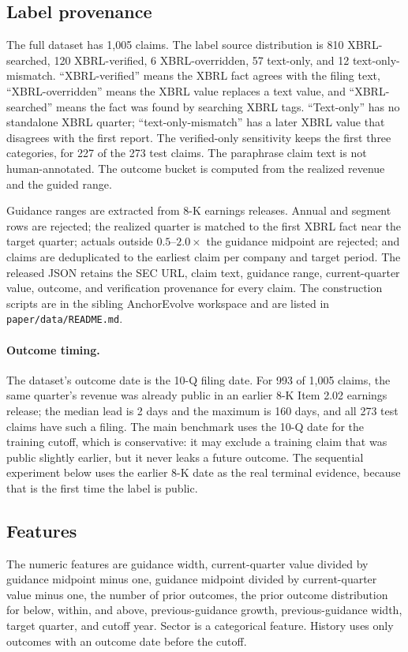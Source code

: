 \documentclass[11pt]{article}
\begin{document}
\subsection{Label provenance}
The full dataset has 1,005 claims. The label source distribution is 810 XBRL-searched, 120 XBRL-verified, 6 XBRL-overridden, 57 text-only, and 12 text-only-mismatch. ``XBRL-verified'' means the XBRL fact agrees with the filing text, ``XBRL-overridden'' means the XBRL value replaces a text value, and ``XBRL-searched'' means the fact was found by searching XBRL tags. ``Text-only'' has no standalone XBRL quarter; ``text-only-mismatch'' has a later XBRL value that disagrees with the first report. The verified-only sensitivity keeps the first three categories, for 227 of the 273 test claims. The paraphrase claim text is not human-annotated. The outcome bucket is computed from the realized revenue and the guided range.

Guidance ranges are extracted from 8-K earnings releases. Annual and segment
rows are rejected; the realized quarter is matched to the first XBRL fact near
the target quarter; actuals outside $0.5$--$2.0\times$ the guidance midpoint are
rejected; and claims are deduplicated to the earliest claim per company and
target period. The released JSON retains the SEC URL, claim text, guidance
range, current-quarter value, outcome, and verification provenance for every
claim. The construction scripts are in the sibling AnchorEvolve workspace and
are listed in \texttt{paper/data/README.md}.

\paragraph{Outcome timing.}
The dataset's outcome date is the 10-Q filing date. For 993 of 1,005 claims,
the same quarter's revenue was already public in an earlier 8-K Item 2.02
earnings release; the median lead is 2 days and the maximum is 160 days, and
all 273 test claims have such a filing. The main benchmark uses the 10-Q date
for the training cutoff, which is conservative: it may exclude a training
claim that was public slightly earlier, but it never leaks a future outcome.
The sequential experiment below uses the earlier 8-K date as the real terminal
evidence, because that is the first time the label is public.

\subsection{Features}
The numeric features are guidance width, current-quarter value divided by guidance midpoint minus one, guidance midpoint divided by current-quarter value minus one, the number of prior outcomes, the prior outcome distribution for below, within, and above, previous-guidance growth, previous-guidance width, target quarter, and cutoff year. Sector is a categorical feature. History uses only outcomes with an outcome date before the cutoff.
\end{document}
